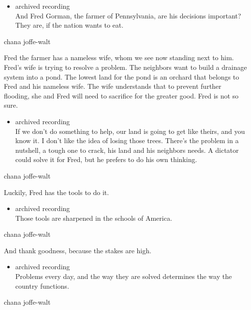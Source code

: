 \begin{itemize}
\tightlist
\item
  archived recording\\
  And Fred Gorman, the farmer of Pennsylvania, are his decisions
  important? They are, if the nation wants to eat.
\end{itemize}

chana joffe-walt

Fred the farmer has a nameless wife, whom we see now standing next to
him. Fred's wife is trying to resolve a problem. The neighbors want to
build a drainage system into a pond. The lowest land for the pond is an
orchard that belongs to Fred and his nameless wife. The wife understands
that to prevent further flooding, she and Fred will need to sacrifice
for the greater good. Fred is not so sure.

\begin{itemize}
\tightlist
\item
  archived recording\\
  If we don't do something to help, our land is going to get like
  theirs, and you know it. I don't like the idea of losing those trees.
  There's the problem in a nutshell, a tough one to crack, his land and
  his neighbors needs. A dictator could solve it for Fred, but he
  prefers to do his own thinking.
\end{itemize}

chana joffe-walt

Luckily, Fred has the tools to do it.

\begin{itemize}
\tightlist
\item
  archived recording\\
  Those tools are sharpened in the schools of America.
\end{itemize}

chana joffe-walt

And thank goodness, because the stakes are high.

\begin{itemize}
\tightlist
\item
  archived recording\\
  Problems every day, and the way they are solved determines the way the
  country functions.
\end{itemize}

chana joffe-walt

